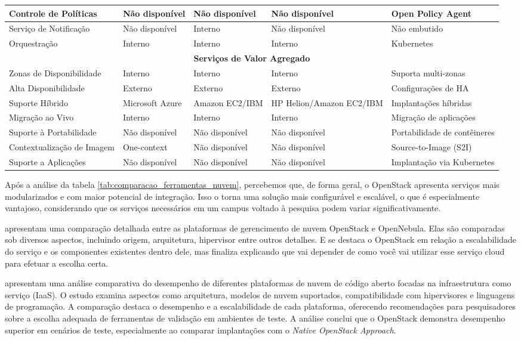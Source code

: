 \begin{longtable}{|p{3cm}|p{2.8cm}|p{2.8cm}|p{2.8cm}|p{2.8cm}|}
\hline
Controle de Políticas & Não disponível & Não disponível & Não disponível & Open Policy Agent \\
\hline
Serviço de Notificação & Não disponível & Interno & Não disponível & Não embutido \\
\hline
Orquestração & Interno & Interno & Interno & Kubernetes \\
\hline
\multicolumn{5}{|c|}{\textbf{Serviços de Valor Agregado}} \\
\hline
Zonas de Disponibilidade & Interno & Interno & Interno & Suporta multi-zonas \\
\hline
Alta Disponibilidade & Externo & Externo & Externo & Configurações de HA \\
\hline
Suporte Híbrido & Microsoft Azure & Amazon EC2/IBM & HP Helion/Amazon EC2/IBM & Implantações híbridas \\
\hline
Migração ao Vivo & Interno & Interno & Interno & Migração de aplicações \\
\hline
Suporte à Portabilidade & Não disponível & Não disponível & Não disponível & Portabilidade de contêineres \\
\hline
Contextualização de Imagem & One-context & Não disponível & Não disponível & Source-to-Image (S2I) \\
\hline
Suporte a Aplicações & Não disponível & Não disponível & Não disponível & Implantação via Kubernetes \\
\hline
\end{longtable}

\normalsize %

Após a análise da tabela \ref{tab:comparacao_ferramentas_nuvem}, percebemos que, de forma geral, o OpenStack apresenta serviços mais modularizados e com maior potencial de integração. Isso o torna uma solução mais configurável e escalável, o que é especialmente vantajoso, considerando que os serviços necessários em um campus voltado à pesquisa podem variar significativamente. 

\cite{wen2012comparison} apresentam uma comparação detalhada entre as plataformas de gerencimento de nuvem OpenStack e OpenNebula. Elas são comparadas sob diversos aspectos, incluindo origem, arquitetura, hipervisor entre outros detalhes. E se destaca o OpenStack em relação a escalabilidade do serviço e os componentes existentes dentro dele, mas finaliza explicando que vai depender de como você vai utilizar esse serviço cloud para efetuar a escolha certa.

\cite{shahzadi2017infrastructure} apresentam uma análise comparativa do desempenho de diferentes plataformas de nuvem de código aberto focadas na infraestrutura como serviço (IaaS). O estudo examina aspectos como arquitetura, modelos de nuvem suportados, compatibilidade com hipervisores e linguagens de programação. A comparação destaca o desempenho e a escalabilidade de cada plataforma, oferecendo recomendações para pesquisadores sobre a escolha adequada de ferramentas de validação em ambientes de teste. A análise conclui que o OpenStack demonstra desempenho superior em cenários de teste, especialmente ao comparar implantações com o \textit{Native OpenStack Approach}.

